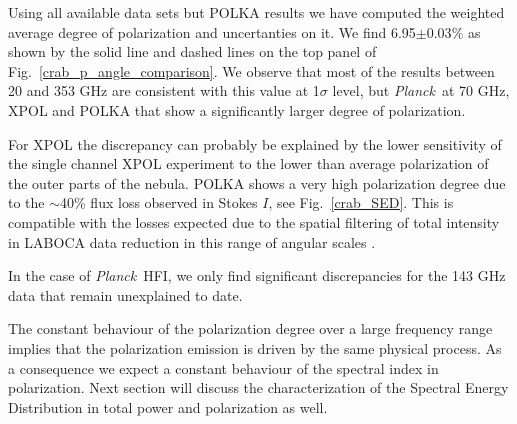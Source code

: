 \documentclass[twocolumn,traditabstract]{aa}
\def\Planck{\textit{Planck}}
\begin{document}
Using all available data sets but POLKA results we have computed the weighted average degree of polarization and uncertanties on it.
We find 6.95$\pm$0.03$\%$ as shown by the solid line and dashed lines on the top panel of Fig.~\ref{crab_p_angle_comparison}. We observe that most of the results between 20 and 353 GHz are consistent with this value at 1$\sigma$ level, but \Planck\ at 70 GHz, XPOL and POLKA that show a significantly larger degree of polarization.

For XPOL the discrepancy can
probably be explained by the lower sensitivity of the single channel XPOL
experiment to the lower than average polarization of the outer parts of the
nebula.
POLKA shows a very high polarization degree due to the $\sim$40\% flux loss observed in Stokes $I$, see Fig.~\ref{crab_SED}. This is compatible with the losses expected due to the spatial filtering of total intensity in LABOCA data reduction in this range of angular scales \citep{2011A&A...527A.145B}.

In the case of \Planck\ HFI, we only find significant discrepancies for the 143 GHz data that remain unexplained to date.

The constant behaviour of the polarization degree over a large frequency range implies that the polarization emission is driven by the same physical process. As a consequence we expect a constant behaviour of the spectral index in polarization. Next section will discuss the characterization of the Spectral Energy Distribution in total power and polarization as well.
\end{document}

